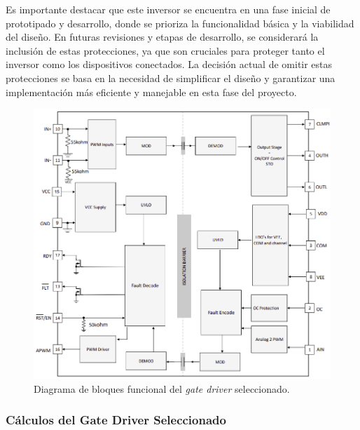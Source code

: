 Es importante destacar que este inversor se encuentra en una fase inicial de prototipado y desarrollo, donde se prioriza la funcionalidad básica y la viabilidad del diseño. En futuras revisiones y etapas de desarrollo, se considerará la inclusión de estas protecciones, ya que son cruciales para proteger tanto el inversor como los dispositivos conectados. La decisión actual de omitir estas protecciones se basa en la necesidad de simplificar el diseño y garantizar una implementación más eficiente y manejable en esta fase del proyecto.

\begin{figure}[H]
	\centering
	\includegraphics[width=0.7\linewidth]{fig/UCC21710-block}
	\caption{Diagrama de bloques funcional del \textit{gate driver} seleccionado.}
\end{figure}


\subsubsection{Cálculos del Gate Driver Seleccionado}



